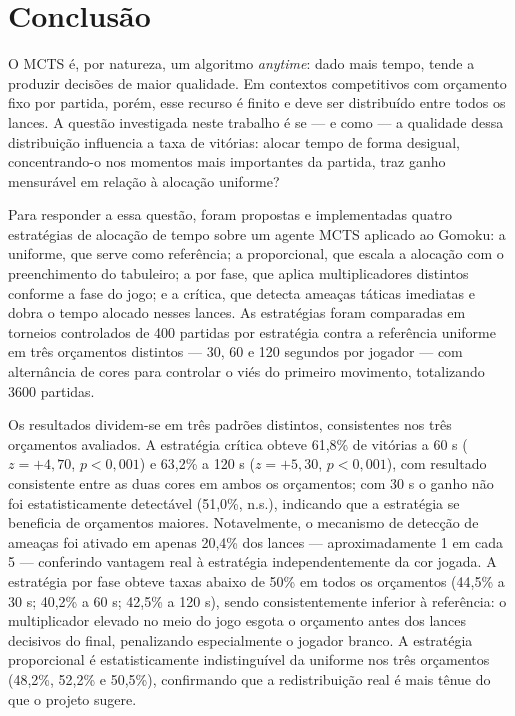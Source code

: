 \documentclass[cic,tc]{iiufrgs}
\begin{document}
\chapter{Conclusão}

O MCTS é, por natureza, um algoritmo \emph{anytime}: dado mais tempo, tende a produzir decisões de maior qualidade. Em contextos competitivos com orçamento fixo por partida, porém, esse recurso é finito e deve ser distribuído entre todos os lances. A questão investigada neste trabalho é se — e como — a qualidade dessa distribuição influencia a taxa de vitórias: alocar tempo de forma desigual, concentrando-o nos momentos mais importantes da partida, traz ganho mensurável em relação à alocação uniforme?

Para responder a essa questão, foram propostas e implementadas quatro estratégias de alocação de tempo sobre um agente MCTS aplicado ao Gomoku: a uniforme, que serve como referência; a proporcional, que escala a alocação com o preenchimento do tabuleiro; a por fase, que aplica multiplicadores distintos conforme a fase do jogo; e a crítica, que detecta ameaças táticas imediatas e dobra o tempo alocado nesses lances. As estratégias foram comparadas em torneios controlados de 400 partidas por estratégia contra a referência uniforme em três orçamentos distintos — 30, 60 e 120 segundos por jogador — com alternância de cores para controlar o viés do primeiro movimento, totalizando 3600 partidas.

Os resultados dividem-se em três padrões distintos, consistentes nos três orçamentos avaliados. A estratégia crítica obteve 61,8\% de vitórias a 60 s ($z = +4{,}70$, $p < 0{,}001$) e 63,2\% a 120 s ($z = +5{,}30$, $p < 0{,}001$), com resultado consistente entre as duas cores em ambos os orçamentos; com 30 s o ganho não foi estatisticamente detectável (51,0\%, n.s.), indicando que a estratégia se beneficia de orçamentos maiores. Notavelmente, o mecanismo de detecção de ameaças foi ativado em apenas 20,4\% dos lances — aproximadamente 1 em cada 5 — conferindo vantagem real à estratégia independentemente da cor jogada. A estratégia por fase obteve taxas abaixo de 50\% em todos os orçamentos (44,5\% a 30 s; 40,2\% a 60 s; 42,5\% a 120 s), sendo consistentemente inferior à referência: o multiplicador elevado no meio do jogo esgota o orçamento antes dos lances decisivos do final, penalizando especialmente o jogador branco. A estratégia proporcional é estatisticamente indistinguível da uniforme nos três orçamentos (48,2\%, 52,2\% e 50,5\%), confirmando que a redistribuição real é mais tênue do que o projeto sugere.
\end{document}
